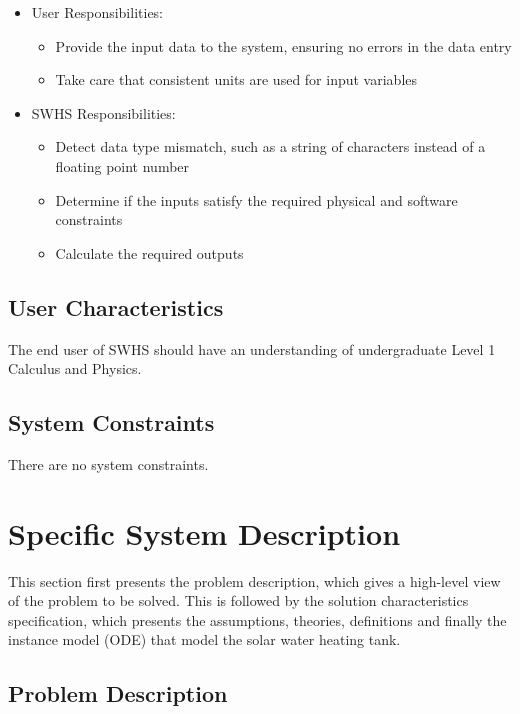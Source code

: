 \documentclass[12pt]{article}
\newcommand{\progname}{SWHS}
\begin{document}
\begin{itemize}
\item User Responsibilities:
\begin{itemize}
\item Provide the input data to the system, ensuring no errors in the data entry
\item Take care that consistent units are used for input variables
\end{itemize}
\item \progname{} Responsibilities:
\begin{itemize}
\item Detect data type mismatch, such as a string of characters instead of a
  floating point number
\item Determine if the inputs satisfy the required physical and software constraints
\item Calculate the required outputs
\end{itemize}
\end{itemize}

\subsection{User Characteristics}

The end user of \progname{} should have an understanding of undergraduate Level
1 Calculus and Physics.

\subsection{System Constraints}

There are no system constraints.

\section{Specific System Description}

This section first presents the problem description, which gives a high-level
view of the problem to be solved.  This is followed by the solution characteristics
specification, which presents the assumptions, theories, definitions and finally
the instance model (ODE) that model the solar water heating tank.%

\subsection{Problem Description} \label{Sec_pd}
\end{document}
